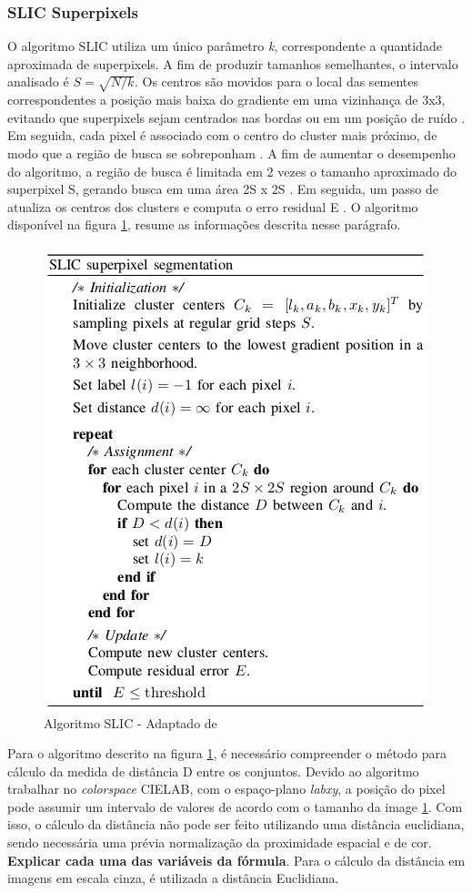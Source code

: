 \begin{document}
\subsubsection{SLIC Superpixels} \label{sssec:slic}

O algoritmo SLIC utiliza um único parâmetro \textit{k}, correspondente a quantidade aproximada de superpixels. A fim de produzir tamanhos semelhantes, o intervalo analisado é $S=\sqrt{N/k}$. Os centros são movidos para o local das sementes correspondentes a posição mais baixa do gradiente em uma vizinhança de 3x3, evitando que superpixels sejam centrados nas bordas ou em um posição de ruído \cite{SLIC}. Em seguida, 
cada pixel é associado com o centro do cluster mais próximo, de modo que a região de busca se sobreponham \cite{SLIC}. A fim de aumentar o desempenho do algoritmo, a região de busca é limitada em 2 vezes o tamanho aproximado do superpixel S, gerando busca em uma área 2S x 2S \cite{SLIC}. Em seguida, um passo de atualiza os centros dos clusters e computa o erro residual E \cite{SLIC}. O algoritmo disponível na figura \ref{alg:SLIC}, resume as informações descrita nesse parágrafo.

\begin{figure}[ht]
\centering
\includegraphics[width=.5\textwidth]{algoritmo_slic.png}
\caption{Algoritmo SLIC - Adaptado de \cite{SLIC}}
\label{alg:SLIC}
\end{figure}

Para o algoritmo descrito na figura \ref{alg:SLIC}, é necessário compreender o método para cálculo da medida de distância D entre os conjuntos. Devido ao algoritmo trabalhar no \textit{colorspace} CIELAB, com o espaço-plano \textit{labxy}, a posição do pixel pode assumir um intervalo de valores de acordo com o tamanho da image \ref{alg:SLIC}. Com isso, o cálculo da distância não pode ser feito utilizando uma distância euclidiana, sendo necessária uma prévia normalização da proximidade espacial e de cor. \textbf{Explicar cada uma das variáveis da fórmula}. Para o cálculo da distância em imagens em escala cinza, é utilizada a distância Euclidiana.
\end{document}
